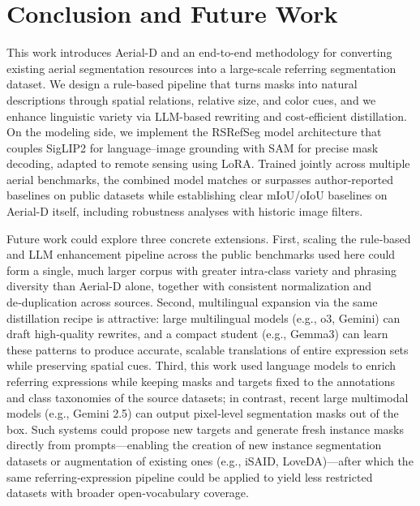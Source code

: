 
\section{Conclusion and Future Work}
\label{sec:conclusion}

This work introduces Aerial\mbox{-}D and an end-to-end methodology for converting existing aerial segmentation resources into a large-scale referring segmentation dataset. We design a rule-based pipeline that turns masks into natural descriptions through spatial relations, relative size, and color cues, and we enhance linguistic variety via LLM-based rewriting and cost-efficient distillation. On the modeling side, we implement the RSRefSeg model architecture that couples SigLIP2 for language–image grounding with SAM for precise mask decoding, adapted to remote sensing using LoRA. Trained jointly across multiple aerial benchmarks, the combined model matches or surpasses author-reported baselines on public datasets while establishing clear mIoU/oIoU baselines on Aerial\mbox{-}D itself, including robustness analyses with historic image filters.

Future work could explore three concrete extensions. First, scaling the rule‑based and LLM enhancement pipeline across the public benchmarks used here could form a single, much larger corpus with greater intra‑class variety and phrasing diversity than Aerial\mbox{-}D alone, together with consistent normalization and de‑duplication across sources. Second, multilingual expansion via the same distillation recipe is attractive: large multilingual models (e.g., o3, Gemini) can draft high‑quality rewrites, and a compact student (e.g., Gemma3) can learn these patterns to produce accurate, scalable translations of entire expression sets while preserving spatial cues. Third, this work used language models to enrich referring expressions while keeping masks and targets fixed to the annotations and class taxonomies of the source datasets; in contrast, recent large multimodal models (e.g., Gemini 2.5\cite{gemini25}) can output pixel‑level segmentation masks out of the box. Such systems could propose new targets and generate fresh instance masks directly from prompts—enabling the creation of new instance segmentation datasets or augmentation of existing ones (e.g., iSAID, LoveDA)—after which the same referring‑expression pipeline could be applied to yield less restricted datasets with broader open‑vocabulary coverage.
